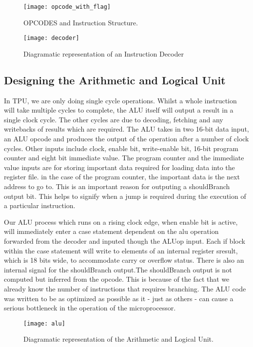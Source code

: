 \begin{figure}[p]

\texttt{[image: opcode\_with\_flag]}
\centering
\caption{OPCODES and Instruction Structure.}
\centering
\label{fig:opcode_bit_flag}
\end{figure}


\begin{figure}[p]

\texttt{[image: decoder]}
\centering
\caption{Diagramatic representation of an Instruction Decoder}
\centering
\label{fig:decode}
\end{figure}



\subsection{Designing the Arithmetic and Logical Unit}

In TPU, we are only doing single cycle operations. Whilst a whole instruction will take multiple cycles to complete, the ALU itself will output a result in a single clock cycle. The other cycles are due to decoding, fetching and any writebacks of results which are required. The ALU takes in two 16-bit data input, an ALU opcode and produces the output of the operation after a number of clock cycles. 
Other inputs include clock, enable bit, write-enable bit, 16-bit program counter and eight bit immediate value. The program counter and the immediate value inputs are for storing important data required for loading data into the register file. in the case of the program counter, the important data is the next address to go to. This is an important reason for outputing a shouldBranch output bit. This helps to signify when a jump is required during the execution of a particular instruction.

Our ALU process which runs on a rising clock edge, when enable bit is active, will immediately enter a case statement dependent on the alu operation forwarded from the decoder and inputed though the ALUop input. 
Each if block within the case statement will write to elements of an internal register sresult, which is 18 bits wide, to accommodate carry or overflow status. There is also an internal signal for the shouldBranch output.The shouldBranch output is not computed but inferred from the opcode. This is because of the fact that we already know the number of instructions that requires branching. 
The ALU code was written to be as optimized as possible as it - just as others - can cause a serious bottleneck in the operation of the microprocessor.
\begin{figure}[p]
\texttt{[image: alu]}
\centering
\caption{Diagramatic representation of the Arithmetic and Logical Unit.}
\centering
\label{fig:alu}
\end{figure}



